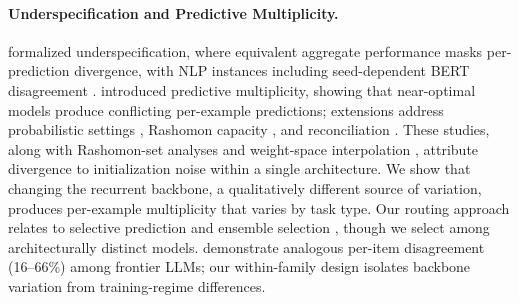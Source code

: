 \paragraph{Underspecification and Predictive Multiplicity.}
\citet{damour2022underspecification} formalized underspecification, where equivalent aggregate performance masks per-prediction divergence, with NLP instances including seed-dependent BERT disagreement \citep{mccoy2020berts,sellam2022multiberts}. \citet{marx2020predictive} introduced predictive multiplicity, showing that near-optimal models produce conflicting per-example predictions; extensions address probabilistic settings \citep{watson2023predictive}, Rashomon capacity \citep{hsu2022rashomon}, and reconciliation \citep{du2025reconciling,haghighat2026resolving}. These studies, along with Rashomon-set analyses \citep{fisher2019all,semenova2022existence} and weight-space interpolation \citep{wortsman2022model}, attribute divergence to initialization noise within a single architecture. We show that changing the recurrent backbone, a qualitatively different source of variation, produces per-example multiplicity that varies by task type. Our routing approach relates to selective prediction \citep{geifman2017selective} and ensemble selection \citep{caruana2004ensemble}, though we select among architecturally distinct models. \citet{yang2026benchmark} demonstrate analogous per-item disagreement (16--66\%) among frontier LLMs; our within-family design isolates backbone variation from training-regime differences.
